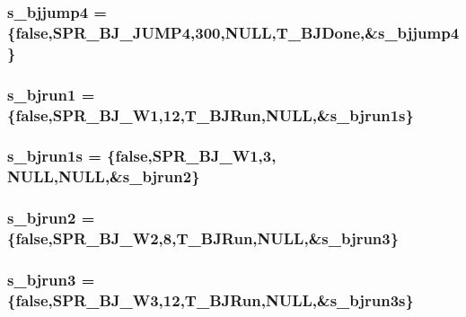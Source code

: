 \hypertarget{WL__ACT2_8C_a3fc57e5fc21a674fa9e5fc0faadf377b}{
\subsubsection[{s\_\-bjjump4}]{ {\bf s\_\-bjjump4} = \{false,SPR\_\-BJ\_\-JUMP4,300,NULL,T\_\-BJDone,\&{\bf s\_\-bjjump4}\}}}
\label{WL__ACT2_8C_a3fc57e5fc21a674fa9e5fc0faadf377b}
\hypertarget{WL__ACT2_8C_a869fc21f9647e150cc5ccf7b186ea458}{
\subsubsection[{s\_\-bjrun1}]{ {\bf s\_\-bjrun1} = \{false,SPR\_\-BJ\_\-W1,12,T\_\-BJRun,NULL,\&{\bf s\_\-bjrun1s}\}}}
\label{WL__ACT2_8C_a869fc21f9647e150cc5ccf7b186ea458}
\hypertarget{WL__ACT2_8C_ab2f61e1d4966f403414c5e0db76fe380}{
\subsubsection[{s\_\-bjrun1s}]{ {\bf s\_\-bjrun1s} = \{false,SPR\_\-BJ\_\-W1,3, NULL,NULL,\&{\bf s\_\-bjrun2}\}}}
\label{WL__ACT2_8C_ab2f61e1d4966f403414c5e0db76fe380}
\hypertarget{WL__ACT2_8C_af57262a1d2d6bcc819652317bf15a4ab}{
\subsubsection[{s\_\-bjrun2}]{ {\bf s\_\-bjrun2} = \{false,SPR\_\-BJ\_\-W2,8,T\_\-BJRun,NULL,\&{\bf s\_\-bjrun3}\}}}
\label{WL__ACT2_8C_af57262a1d2d6bcc819652317bf15a4ab}
\hypertarget{WL__ACT2_8C_a66113b56ff2490b2b358ee648f30c863}{
\subsubsection[{s\_\-bjrun3}]{ {\bf s\_\-bjrun3} = \{false,SPR\_\-BJ\_\-W3,12,T\_\-BJRun,NULL,\&{\bf s\_\-bjrun3s}\}}}
